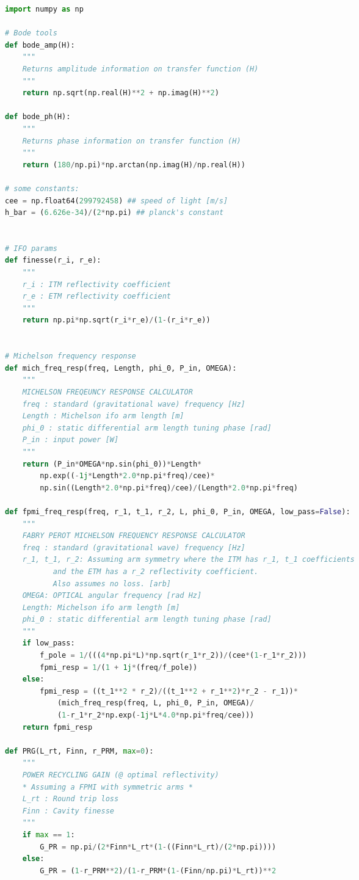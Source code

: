 \begin{spacing}{1}
\begin{lstlisting}[frame=single, language=Python]
import numpy as np

# Bode tools 
def bode_amp(H):
    """
    Returns amplitude information on transfer function (H)
    """
    return np.sqrt(np.real(H)**2 + np.imag(H)**2)

def bode_ph(H):
    """
    Returns phase information on transfer function (H)
    """
    return (180/np.pi)*np.arctan(np.imag(H)/np.real(H))

# some constants:
cee = np.float64(299792458) ## speed of light [m/s]
h_bar = (6.626e-34)/(2*np.pi) ## planck's constant


# IFO params
def finesse(r_i, r_e):
    """
    r_i : ITM reflectivity coefficient
    r_e : ETM reflectivity coefficient
    """
    return np.pi*np.sqrt(r_i*r_e)/(1-(r_i*r_e))


# Michelson frequency response
def mich_freq_resp(freq, Length, phi_0, P_in, OMEGA):
    """ 
    MICHELSON FREQEUNCY RESPONSE CALCULATOR
    freq : standard (gravitational wave) frequency [Hz]
    Length : Michelson ifo arm length [m]
    phi_0 : static differential arm length tuning phase [rad]
    P_in : input power [W] 
    """
    return (P_in*OMEGA*np.sin(phi_0))*Length*
	    np.exp((-1j*Length*2.0*np.pi*freq)/cee)*
	    np.sin((Length*2.0*np.pi*freq)/cee)/(Length*2.0*np.pi*freq)

def fpmi_freq_resp(freq, r_1, t_1, r_2, L, phi_0, P_in, OMEGA, low_pass=False):
    """
    FABRY PEROT MICHELSON FREQUENCY RESPONSE CALCULATOR
    freq : standard (gravitational wave) frequency [Hz]
    r_1, t_1, r_2: Assuming arm symmetry where the ITM has r_1, t_1 coefficients 
		   and the ETM has a r_2 reflectivity coefficient. 
		   Also assumes no loss. [arb]
    OMEGA: OPTICAL angular frequency [rad Hz]
    Length: Michelson ifo arm length [m]
    phi_0 : static differential arm length tuning phase [rad]
    """
    if low_pass:
        f_pole = 1/(((4*np.pi*L)*np.sqrt(r_1*r_2))/(cee*(1-r_1*r_2)))
        fpmi_resp = 1/(1 + 1j*(freq/f_pole))
    else:
        fpmi_resp = ((t_1**2 * r_2)/((t_1**2 + r_1**2)*r_2 - r_1))*
		    (mich_freq_resp(freq, L, phi_0, P_in, OMEGA)/
		    (1-r_1*r_2*np.exp(-1j*L*4.0*np.pi*freq/cee)))
    return fpmi_resp

def PRG(L_rt, Finn, r_PRM, max=0):
    """
    POWER RECYCLING GAIN (@ optimal reflectivity)
    * Assuming a FPMI with symmetric arms *
    L_rt : Round trip loss
    Finn : Cavity finesse
    """
    if max == 1:
        G_PR = np.pi/(2*Finn*L_rt*(1-((Finn*L_rt)/(2*np.pi))))
    else:
        G_PR = (1-r_PRM**2)/(1-r_PRM*(1-(Finn/np.pi)*L_rt))**2



\end{lstlisting}
\end{spacing}

